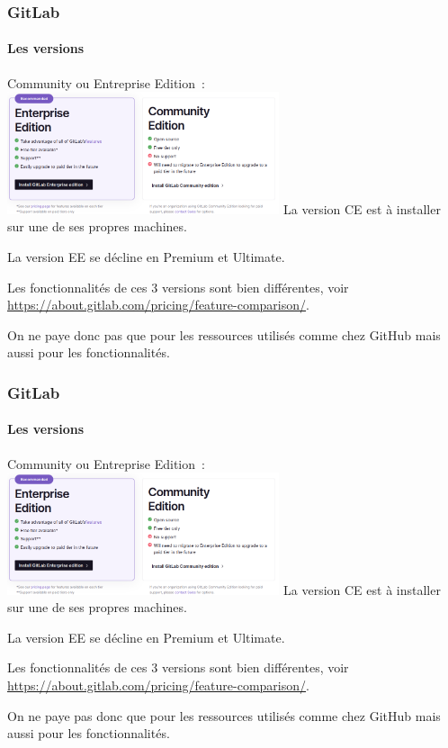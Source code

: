 \documentclass{beamer}
\begin{document}
    \begin{frame}
        \frametitle{GitLab}
        \framesubtitle{Les versions}
        \transdissolve
        Community ou Entreprise Edition~:
        \bigbreak
        \centering
        \includegraphics[width=8cm]{image/gitlab-versions}
        \flushleft
        La version CE est à installer sur une de ses propres machines.

        La version EE se décline en Premium et Ultimate.

        Les fonctionnalités de ces 3 versions sont bien différentes, voir \url{https://about.gitlab.com/pricing/feature-comparison/}.

        On ne paye donc pas que pour les ressources utilisés comme chez GitHub mais aussi pour les fonctionnalités.
    \end{frame}

    \begin{frame}
        \frametitle{GitLab}
        \framesubtitle{Les versions}
        \transdissolve
        Community ou Entreprise Edition~:
        \bigbreak
        \centering
        \includegraphics[width=8cm]{image/gitlab-versions}
        \flushleft
        La version CE est à installer sur une de ses propres machines.

        La version EE se décline en Premium et Ultimate.

        Les fonctionnalités de ces 3 versions sont bien différentes, voir \url{https://about.gitlab.com/pricing/feature-comparison/}.

        On ne paye pas donc que pour les ressources utilisés comme chez GitHub mais aussi pour les fonctionnalités.
    \end{frame}
\end{document}
